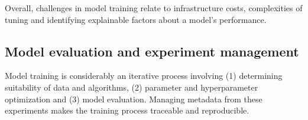 
Overall, challenges in model training relate to infrastructure costs, complexities of tuning and identifying explainable factors about a model's performance. 

\subsection{Model evaluation and experiment management}
Model training is considerably an iterative process involving (1) determining suitability of data and algorithms, (2) parameter and hyperparameter optimization and (3) model evaluation. 
Managing metadata from these experiments makes the training process traceable and reproducible.

